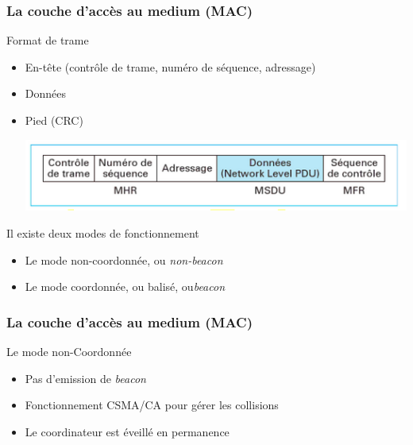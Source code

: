 \documentclass{beamer}
\begin{document}
  \begin{frame}
    \frametitle{La couche d'accès au medium (MAC)}
    \begin{block}{Format de trame}
      \begin{itemize}
        \item En-tête (contrôle de trame, numéro de séquence, adressage)
        \item Données
        \item Pied (CRC)
        \begin{center}
         \includegraphics[scale=0.6]{Couche-MAC.png}
        \end{center} 
      \end{itemize}
    \end{block}
  \end{frame}
  
  \begin{frame}
    \begin{block}{Il existe deux modes de fonctionnement}
      \begin{itemize}
        \item Le mode non-coordonnée, ou \textit{non-beacon}
        \item Le mode coordonnée, ou balisé, ou\textit{beacon}
      \end{itemize}
    \end{block}
  \end{frame}

  
  \begin{frame}
    \frametitle{La couche d'accès au medium (MAC)}
    \begin{block}{Le mode non-Coordonnée}
      \begin{itemize}
        \item Pas d'emission de \textit{beacon}
        \item Fonctionnement CSMA/CA pour gérer les collisions
        \item Le coordinateur est éveillé en permanence
      \end{itemize}
    \end{block}
  \end{frame}
\end{document}

